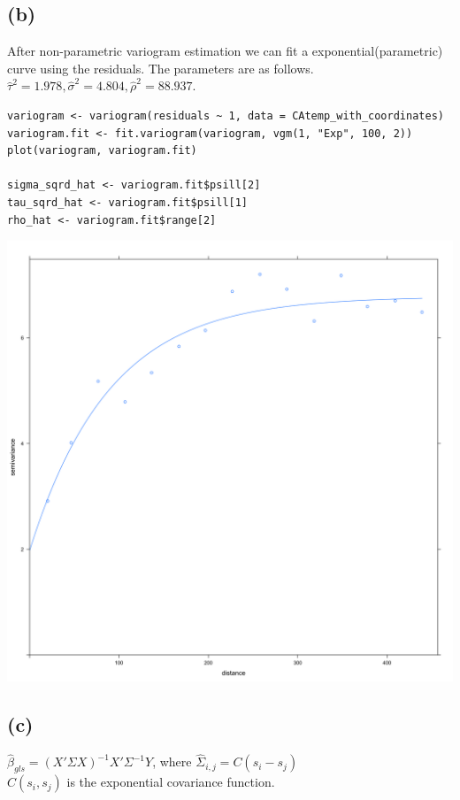 \documentclass[11pt]{article}
\begin{document}
\subsection*{(b)}
After non-parametric variogram estimation we can fit a exponential(parametric) curve using the residuals.
The parameters are as follows. \\
$
\hat{\tau}^2 = 1.978, \hat{\sigma}^2 = 4.804, \hat{\rho}^2 = 88.937.
$
\begin{lstlisting}
variogram <- variogram(residuals ~ 1, data = CAtemp_with_coordinates)
variogram.fit <- fit.variogram(variogram, vgm(1, "Exp", 100, 2))
plot(variogram, variogram.fit)

sigma_sqrd_hat <- variogram.fit$psill[2]
tau_sqrd_hat <- variogram.fit$psill[1]
rho_hat <- variogram.fit$range[2]
\end{lstlisting}

\includegraphics[width=\textwidth]{variogram.png}

\subsection*{(c)}
$\hat{\beta}_{gls} = (X'\Sigma X)^{-1}X'\Sigma^{-1}Y$, where $\hat{\Sigma}_{i,j} = C(s_{i}-s_{j})$ \\
$C(s_{i}, s_{j})$ is the exponential covariance function. \\
\end{document}
